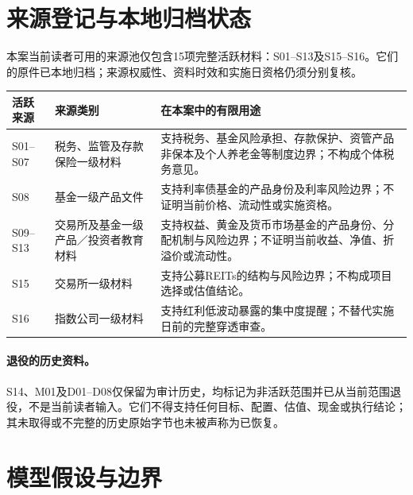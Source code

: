 \section{来源登记与本地归档状态}

本案当前读者可用的来源池仅包含15项完整活跃材料：S01--S13及S15--S16。它们的原件已本地归档；来源权威性、资料时效和实施日资格仍须分别复核。

\begin{longtable}{L{2.0cm}L{4.1cm}L{9.1cm}}
\toprule
\textbf{活跃来源} & \textbf{来源类别} & \textbf{在本案中的有限用途} \\
\midrule
S01--S07 & 税务、监管及存款保险一级材料 & 支持税务、基金风险承担、存款保护、资管产品非保本及个人养老金等制度边界；不构成个体税务意见。 \\
S08 & 基金一级产品文件 & 支持利率债基金的产品身份及利率风险边界；不证明当前价格、流动性或实施资格。 \\
S09--S13 & 交易所及基金一级产品／投资者教育材料 & 支持权益、黄金及货币市场基金的产品身份、分配机制与风险边界；不证明当前收益、净值、折溢价或流动性。 \\
S15 & 交易所一级材料 & 支持公募REITs的结构与风险边界；不构成项目选择或估值结论。 \\
S16 & 指数公司一级材料 & 支持红利低波动暴露的集中度提醒；不替代实施日前的完整穿透审查。 \\
\bottomrule
\end{longtable}

\paragraph{退役的历史资料。}
S14、M01及D01--D08仅保留为审计历史，均标记为非活跃范围并已从当前范围退役，不是当前读者输入。它们不得支持任何目标、配置、估值、现金或执行结论；其未取得或不完整的历史原始字节也未被声称为已恢复。

\section{模型假设与边界}

